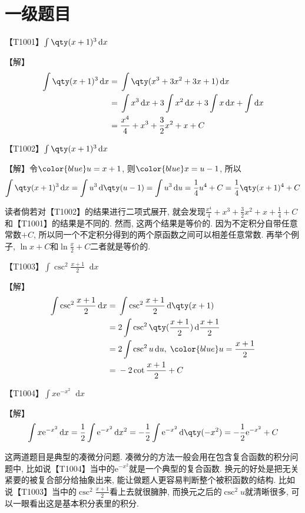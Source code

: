 \documentclass{ctexbook}
\newcommand{\e}{\mathrm{e}}
\newcommand*{\dif}{\mathop{}\!\mathrm{d}}
\begin{document}
{\chapter*{一级题目}
{\color{red}【T1001】}$\int\qty(x+1)^{3}\dif{x}$\par
【解】
\begin{align*}
\int\qty(x+1)^{3}\dif{x}={}&\int\qty(x^{3}+3x^{2}+3x+1)\dif{x}\\
={}&\int x^{3}\dif{x}+3\int x^{2}\dif{x}+3\int x\dif{x}+\int\dif{x}\\
={}&\frac{x^{4}}{4}+x^{3}+\frac{3}{2}x^{2}+x+C
\end{align*}\par
{\color{red}【T1002】}$\int\qty(x+1)^{3}\dif{x}$\par
【解】令$\color{blue}u=x+1$, 则$\color{blue}x=u-1$, 所以
\begin{align*}
\int\qty(x+1)^{3}\dif{x}=\int u^{3}\dif{\qty(u-1)}=\int u^{3}\dif{u}=\frac{1}{4}u^{4}+C=\frac{1}{4}\qty(x+1)^{4}+C
\end{align*}\par
{\kaishu 读者倘若对{\color{red}【T1002】}的结果进行二项式展开, 就会发现$\frac{x^{4}}{4}+x^{3}+\frac{3}{2}x^{2}+x+\frac{1}{4}+C$和{\color{red}【T1001】}的结果是不同的. 然而, 这两个结果是等价的. 因为不定积分自带任意常数$+C$, 所以同一个不定积分得到的两个原函数之间可以相差任意常数. 再举个例子, $\ln{x}+C$和$\ln{\frac{x}{2}}+C$二者就是等价的. \par}
{\color{red}【T1003】}$\int\csc^{2}{\frac{x+1}{2}}\dif{x}$\par
【解】
\begin{align*}
\int\csc^{2}{\frac{x+1}{2}}\dif{x}={}&\int\csc^{2}{\frac{x+1}{2}}\dif{\qty(x+1)}\\
={}&2\int\csc^{2}\qty(\frac{x+1}{2})\dif{\frac{x+1}{2}}\\
={}&2\int\csc^{2}{u}\dif{u},\;{\color{blue}u=\frac{x+1}{2}}\\
={}&-2\cot{\frac{x+1}{2}}+C
\end{align*}\par
{\color{red}【T1004】}$\int x\e^{-x^{2}}\dif{x}$\par
【解】
\begin{align*}
\int x\e^{-x^{2}}\dif{x}=\frac{1}{2}\int\e^{-x^{2}}\dif{x^{2}}=-\frac{1}{2}\int\e^{-x^{2}}\dif{\qty(-x^{2})}=-\frac{1}{2}\e^{-x^{2}}+C
\end{align*}\par
{\kaishu 这两道题目是典型的凑微分问题. 凑微分的方法一般会用在包含复合函数的积分问题中, 比如说{\color{red}【T1004】}当中的$\e^{-x^{2}}$就是一个典型的复合函数. 换元的好处是把无关紧要的被复合部分给抽象出来, 能让做题人更容易判断整个被积函数的结构. 比如说{\color{red}【T1003】}当中的$\csc^{2}{\frac{x+1}{2}}$看上去就很臃肿, 而换元之后的$\csc^{2}{u}$就清晰很多, 可以一眼看出这是基本积分表里的积分. \par
}}
\end{document}
